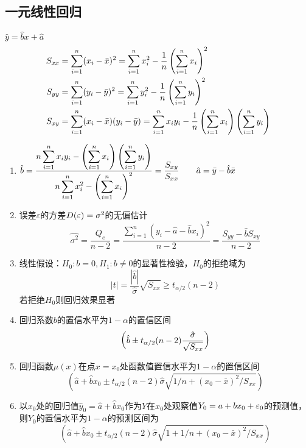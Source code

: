 \subsection{一元线性回归}
$\hat{y}=\hat{b}x+\hat{a}$
\[\begin{aligned}
S_{xx}&=\sum_{i=1}^n(x_i-\bar{x})^2=\sum_{i=1}^nx_i^2-\frac{1}{n}\left(\sum_{i=1}^nx_i\right)^2\\
S_{yy}&=\sum_{i=1}^n(y_i-\bar{y})^2=\sum_{i=1}^ny_i^2-\frac{1}{n}\left(\sum_{i=1}^ny_i\right)^2\\
S_{xy}&=\sum_{i=1}^n(x_i-\bar{x})(y_i-\bar{y})=\sum_{i=1}^nx_iy_i-\frac{1}{n}\left(\sum_{i=1}^nx_i\right)\left(\sum_{i=1}^ny_i\right)
\end{aligned}\]
\begin{enumerate}
	\item $\displaystyle\hat{b}=\dfrac{\displaystyle n\sum_{i=1}^nx_iy_i-\left(\sum_{i=1}^nx_i\right)\left(\sum_{i=1}^ny_i\right)}{\displaystyle n\sum_{i=1}^nx_i^2-\left(\sum_{i=1}^nx_i\right)^2}=\frac{S_{xy}}{S_{xx}}\qquad\hat{a}=\bar{y}-\hat{b}\bar{x}$
	\item 误差$\varepsilon$的方差$D(\varepsilon)=\sigma^2$的无偏估计
	\[\widehat{\sigma^2}=\frac{Q_e}{n-2}=\frac{\sum_{i=1}^n(y_i-\hat{a}-\hat{b}x_i)^2}{n-2}=\frac{S_{yy}-\hat{b}S_{xy}}{n-2}\]
	\item 线性假设：$H_0:b=0,H_1:b\ne 0$的显著性检验，$H_0$的拒绝域为
	\[|t|=\frac{|\hat{b}|}{\hat{\sigma}}\sqrt{S_{xx}}\geq t_{\alpha/2}(n-2)\]
	若拒绝$H_0$则回归效果显著
	\item 回归系数$b$的置信水平为$1-\alpha$的置信区间
	\[\left(\hat{b}\pm t_{\alpha/2}(n-2)\frac{\hat{\sigma}}{\sqrt{S_{xx}}}\right)\]
	\item 回归函数$\mu(x)$在点$x=x_0$处函数值置信水平为$1-\alpha$的置信区间
	\[(\hat{a}+\hat{b}x_0\pm t_{\alpha/2}(n-2)\hat{\sigma}\sqrt{1/n+(x_0-\bar{x})^2/S_{xx}})\]
	\item 以$x_0$处的回归值$\hat{y}_0=\hat{a}+\hat{b}x_0$作为$Y$在$x_0$处观察值$Y_0=a+bx_0+\varepsilon_0$的预测值，则$Y_0$的置信水平为$1-\alpha$的预测区间为
	\[(\hat{a}+\hat{b}x_0\pm t_{\alpha/2}(n-2)\hat{\sigma}\sqrt{1+1/n+(x_0-\bar{x})^2/S_{xx}})\]
\end{enumerate}